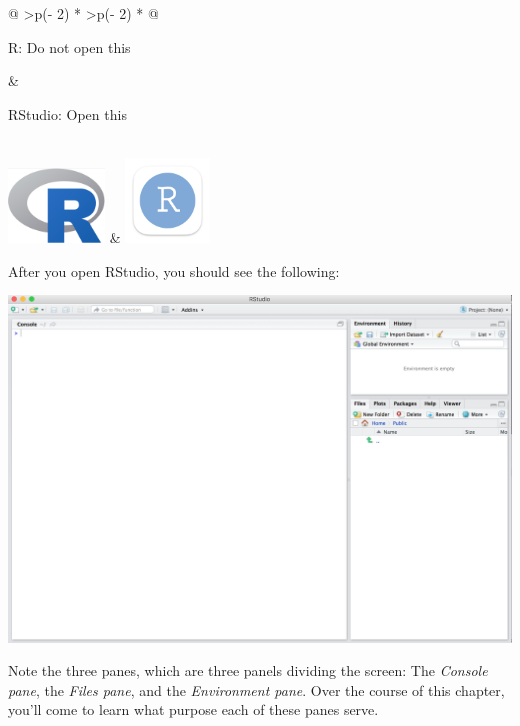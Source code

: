 \documentclass[
  letterpaper,
  DIV=11,
  numbers=noendperiod]{scrreprt}
\theoremstyle{definition}
\theoremstyle{remark}
\begin{document}
\begin{longtable}[]{@{}
  >{\centering\arraybackslash}p{(\columnwidth - 2\tabcolsep) * }
  >{\centering\arraybackslash}p{(\columnwidth - 2\tabcolsep) * }@{}}
\toprule\noalign{}
\begin{minipage}[b]{\linewidth}\centering
R: Do not open this
\end{minipage} & \begin{minipage}[b]{\linewidth}\centering
RStudio: Open this
\end{minipage} \\
\midrule\noalign{}
\endhead
\bottomrule\noalign{}
\endlastfoot
\includegraphics[width=\textwidth,height=0.78125in]{images/logos/Rlogo.png}
&
\includegraphics[width=0.88542in,height=\textheight]{images/logos/rstudio-square-logo.png} \\
\end{longtable}

After you open RStudio, you should see the following:

\includegraphics{images/rstudio.png}

Note the three panes, which are three panels dividing the screen: The
\emph{Console pane}, the \emph{Files pane}, and the \emph{Environment
pane}. Over the course of this chapter, you'll come to learn what
purpose each of these panes serve.
\end{document}
